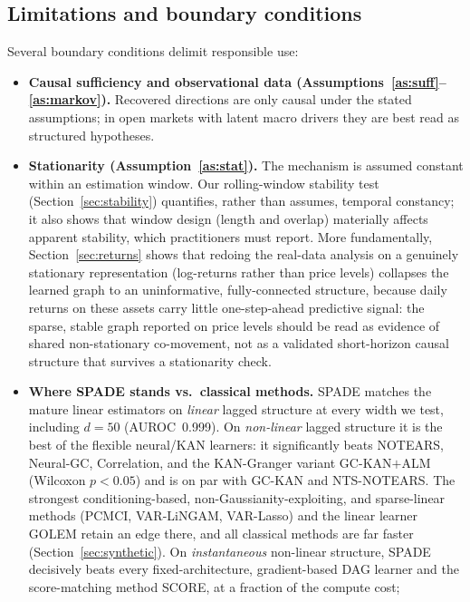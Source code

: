 \subsection{Limitations and boundary conditions}
\label{sec:limits}
Several boundary conditions delimit responsible use:
\begin{itemize}
    \item \textbf{Causal sufficiency and observational data
    (Assumptions~\ref{as:suff}--\ref{as:markov}).} Recovered
    directions are only causal under the stated assumptions; in open markets with
    latent macro drivers they are best read as structured hypotheses.
    \item \textbf{Stationarity (Assumption~\ref{as:stat}).} The mechanism is assumed constant within an
    estimation window. Our rolling-window stability test
    (Section~\ref{sec:stability}) quantifies, rather than assumes, temporal
    constancy; it also shows that window design (length and overlap) materially
    affects apparent stability, which practitioners must report. More
    fundamentally, Section~\ref{sec:returns} shows that redoing the real-data
    analysis on a genuinely stationary representation (log-returns rather than
    price levels) collapses the learned graph to an uninformative,
    fully-connected structure, because daily returns on these assets carry
    little one-step-ahead predictive signal: the sparse, stable graph reported
    on price levels should be read as evidence of shared non-stationary
    co-movement, not as a validated short-horizon causal structure that
    survives a stationarity check.
    \item \textbf{Where SPADE stands vs.\ classical methods.} SPADE matches the
    mature linear estimators on \emph{linear} lagged structure at every width we
    test, including $d{=}50$ (AUROC~0.999). On \emph{non-linear} lagged
    structure it is the best of the flexible neural/KAN learners: it
    significantly beats NOTEARS, Neural-GC, Correlation, and the KAN-Granger
    variant GC-KAN$+$ALM (Wilcoxon $p<0.05$) and is on par with GC-KAN and
    NTS-NOTEARS. The strongest conditioning-based, non-Gaussianity-exploiting,
    and sparse-linear methods (PCMCI, VAR-LiNGAM, VAR-Lasso) and the linear
    learner GOLEM retain an edge there, and all classical methods are far faster
    (Section~\ref{sec:synthetic}). On \emph{instantaneous} non-linear structure,
    SPADE decisively beats every fixed-architecture, gradient-based DAG learner
    and the score-matching method SCORE, at a fraction of the compute cost;

\end{itemize}
